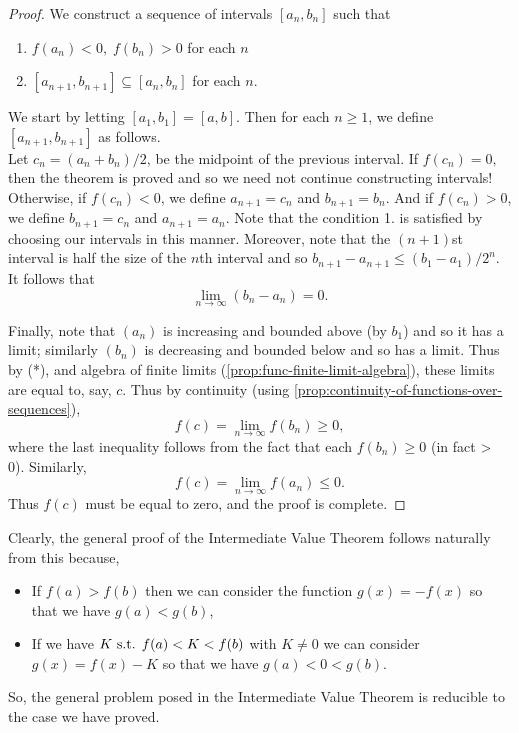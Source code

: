 \documentclass[../MathsNotesBase.tex]{subfiles}
\begin{document}
	\begin{proof}
		We construct a sequence of intervals ${ [a_n, b_n] }$ such that
		\begin{enumerate}
			\item{${ f(a_n) < 0,\; f(b_n) > 0 }$ for each $ n $}
			\item{${ [a_{n+1}, b_{n+1}] \subseteq [a_n, b_n] }$ for each $ n $.}
		\end{enumerate}				
		We start by letting ${ [a_1, b_1] = [a, b]. }$ Then for each ${ n \geq 1 }$, we define ${ [a_{n+1}, b_{n+1}] }$ as follows.\\
		
		Let ${ c_n = (a_n + b_n)/2 }$, be the midpoint of the previous interval. If ${ f(c_n) = 0, }$ then the
		theorem is proved and so we need not continue constructing intervals!\\
		
		Otherwise, if ${ f(c_n) < 0 }$, we define ${ a_{n+1} = c_n }$ and ${ b_{n+1} = b_n }$. And if ${ f(c_n) > 0 }$, we define
		${ b_{n+1} = c_n }$ and ${ a_{n+1} = a_n }$. Note that the condition 1. is satisfied by choosing our intervals in this manner.
		Moreover, note that the ${ (n + 1) }$st interval is half the size of the $n$th interval and so
		${ b_{n+1} - a_{n+1} \leq (b_1 - a_1)/2^n }$. It follows that
		\[ \lim_{n \to \infty} (b_n - a_n) = 0.  \tag{*}\]
		
		Finally, note that $(a_n)$ is increasing and bounded above (by $b_1$) and so it has a limit; similarly $(b_n)$ is decreasing and bounded below and so has a limit. Thus by (*), and algebra of finite limits (\autoref{prop:func-finite-limit-algebra}), these limits are equal to, say, $c$. Thus by continuity (using \autoref{prop:continuity-of-functions-over-sequences}),
		\[ f(c) = \lim_{n \to \infty} f(b_n) \geq 0, \]
		where the last inequality follows from the fact that each ${ f(b_n) \geq 0 }$ (in fact > 0). 
		Similarly,
		\[ f(c) = \lim_{n \to \infty} f(a_n) \leq 0. \]
		Thus $ f(c) $ must be equal to zero, and the proof is complete.
	\end{proof}
	Clearly, the general proof of the Intermediate Value Theorem follows naturally from this because,
	\begin{itemize}
		\item{If ${ f(a) > f(b) }$ then we can consider the function ${ g(x) = -f(x) }$ so that we have ${ g(a) < g(b) }$,}
		\item{If we have ${ K \text{ s.t. } f(a) < K < f(b) }$ with ${ K \neq 0 }$ we can consider ${ g(x) = f(x) - K }$ so that we have ${ g(a) < 0 < g(b) }$.}
	\end{itemize}
	So, the general problem posed in the Intermediate Value Theorem is reducible to the case we have proved.
	
\end{document}
